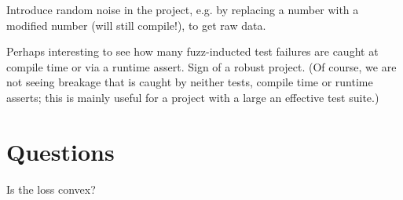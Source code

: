\documentclass[12pt]{article}
\begin{document}
Introduce random noise in the project, e.g. by replacing a number with a modified number (will still compile!), to get raw data.

Perhaps interesting to see how many fuzz-inducted test failures are caught at compile time or via a runtime assert. Sign of a robust project. (Of course, we are not seeing breakage that is caught by neither tests, compile time or runtime asserts; this is mainly useful for a project with a large an effective test suite.)

\section{Questions}

Is the loss convex?

%
%
\end{document}
